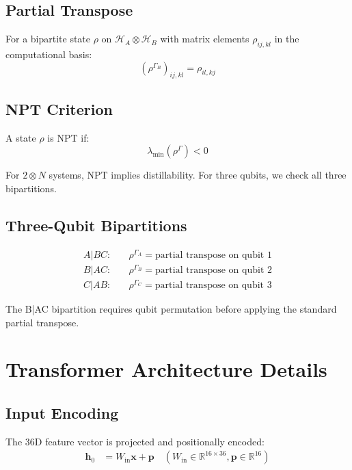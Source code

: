 \documentclass[11pt,a4paper]{article}
\newcommand{\R}{\mathbb{R}}
\begin{document}
\subsection{Partial Transpose}

For a bipartite state $\rho$ on $\mathcal{H}_A \otimes \mathcal{H}_B$ with matrix elements $\rho_{ij,kl}$ in the computational basis:
\begin{equation}
(\rho^{\Gamma_B})_{ij,kl} = \rho_{il,kj}
\end{equation}

\subsection{NPT Criterion}

A state $\rho$ is NPT if:
\begin{equation}
\lambda_{\min}(\rho^{\Gamma}) < 0
\end{equation}

For $2 \otimes N$ systems, NPT implies distillability. For three qubits, we check all three bipartitions.

\subsection{Three-Qubit Bipartitions}

\begin{align}
A|BC: & \quad \rho^{\Gamma_A} = \text{partial transpose on qubit 1} \\
B|AC: & \quad \rho^{\Gamma_B} = \text{partial transpose on qubit 2} \\
C|AB: & \quad \rho^{\Gamma_C} = \text{partial transpose on qubit 3}
\end{align}

The B|AC bipartition requires qubit permutation before applying the standard partial transpose.

\section{Transformer Architecture Details}

\subsection{Input Encoding}

The 36D feature vector is projected and positionally encoded:
\begin{align}
\mathbf{h}_0 &= W_{\text{in}} \mathbf{x} + \mathbf{p} \quad (W_{\text{in}} \in \R^{16 \times 36}, \mathbf{p} \in \R^{16})
\end{align}
\end{document}
